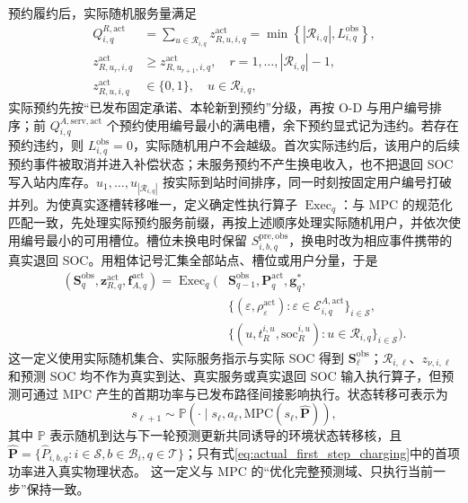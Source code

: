 \documentclass[12pt,a4paper,UTF8]{ctexart}
\begin{document}
预约履约后，实际随机服务量满足
\begin{subequations}
\label{eq:actual_random_service}
\begin{align}
Q_{i,q}^{R,\mathrm{act}}
&=\sum_{u\in\mathcal R_{i,q}}z_{R,u,i,q}^{\mathrm{act}}
=\min\!\left\{|\mathcal R_{i,q}|,L_{i,q}^{\mathrm{obs}}\right\},
\label{eq:actual_random_service_count}\\
z_{R,u_r,i,q}^{\mathrm{act}}
&\ge z_{R,u_{r+1},i,q}^{\mathrm{act}},
\quad r=1,\ldots,|\mathcal R_{i,q}|-1,
\label{eq:actual_random_fcfs}\\
z_{R,u,i,q}^{\mathrm{act}}
&\in\{0,1\},
\quad u\in\mathcal R_{i,q},
\label{eq:actual_random_service_domain}
\end{align}
\end{subequations}
实际预约先按“已发布固定承诺、本轮新到预约”分级，再按 O-D 与用户编号排序；前 $Q_{i,q}^{A,\mathrm{serv,act}}$ 个预约使用编号最小的满电槽，余下预约显式记为违约。若存在预约违约，则 $L_{i,q}^{\mathrm{obs}}=0$，实际随机用户不会越级。首次实际违约后，该用户的后续预约事件被取消并进入补偿状态；未服务预约不产生换电收入，也不把退回 SOC 写入站内库存。$u_1,\ldots,u_{|\mathcal R_{i,q}|}$ 按实际到站时间排序，同一时刻按固定用户编号打破并列。为使真实逐槽转移唯一，定义确定性执行算子 $\operatorname{Exec}_q$：与 MPC 的规范化匹配一致，先处理实际预约服务前缀，再按上述顺序处理实际随机用户，并依次使用编号最小的可用槽位。槽位未换电时保留 $S_{i,b,q}^{\mathrm{pre,obs}}$，换电时改为相应事件携带的真实退回 SOC。用粗体记号汇集全部站点、槽位或用户分量，于是
\begin{equation}
\begin{aligned}
(\mathbf S_{q}^{\mathrm{obs}},\mathbf z_{R,q}^{\mathrm{act}},
\mathbf f_{A,q}^{\mathrm{act}})
=\operatorname{Exec}_q\!\Big(&
\mathbf S_{q-1}^{\mathrm{obs}},\mathbf P_q^{\mathrm{act}},\mathbf g_q^*,\\
&\{(\varepsilon,\rho_\varepsilon^{\mathrm{act}}):
\varepsilon\in\mathcal E_{i,q}^{A,\mathrm{act}}\}_{i\in\mathcal S},
\\
&\{(u,t_R^{i,u},\mathrm{soc}_R^{i,u}):u\in\mathcal R_{i,q}\}_{i\in\mathcal S}
\Big).
\end{aligned}
\label{eq:actual_execution_operator}
\end{equation}
这一定义使用实际随机集合、实际服务指示与实际 SOC 得到 $\mathbf S_{\ell}^{\mathrm{obs}}$；$\mathcal R_{i,\ell}$、$z_{\nu,i,\ell}$ 和预测 SOC 均不作为真实到达、真实服务或真实退回 SOC 输入执行算子，但预测可通过 MPC 产生的首期功率与已发布路径间接影响执行。状态转移可表示为
\begin{equation}
s_{\ell+1}
\sim
\mathbb P\!\left(
\cdot\mid
s_\ell,a_\ell,
\mathrm{MPC}(s_\ell,\widehat{\mathbf P})
\right),
\label{eq:rl_transition}
\end{equation}
其中 $\mathbb P$ 表示随机到达与下一轮预测更新共同诱导的环境状态转移核，且
$\widehat{\mathbf P}=\{\widehat P_{i,b,q}:i\in\mathcal S,b\in\mathcal B_i,q\in\mathcal T\}$；只有式\eqref{eq:actual_first_step_charging}中的首项功率进入真实物理状态。
这一定义与 MPC 的“优化完整预测域、只执行当前一步”保持一致。
\end{document}
